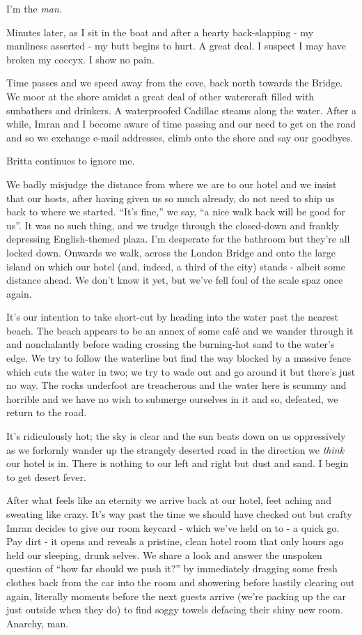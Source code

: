 \documentclass[a5paper,titlepage,draft]{book}
\begin{document}
I'm the \emph{man}.

Minutes later, as I sit in the boat and after a hearty back-slapping - my manliness asserted - my butt begins to hurt.  A great deal.  I suspect I may have broken my coccyx.  I show no pain.

Time passes and we speed away from the cove, back north towards the Bridge.  We moor at the shore amidst a great deal of other watercraft filled with sunbathers and drinkers.  A waterproofed Cadillac steams along the water.  After a while, Imran and I become aware of time passing and our need to get on the road and so we exchange e-mail addresses, climb onto the shore and say our goodbyes.

Britta continues to ignore me.

We badly misjudge the distance from where we are to our hotel and we insist that our hosts, after having given us so much already, do not need to ship us back to where we started.  ``It's fine,'' we say, ``a nice walk back will be good for us''.  It was no such thing, and we trudge through the closed-down and frankly depressing English-themed plaza.  I'm desperate for the bathroom but they're all locked down.  Onwards we walk, across the London Bridge and onto the large island on which our hotel (and, indeed, a third of the city) stands - albeit some distance ahead.  We don't know it yet, but we've fell foul of the scale spaz once again.

It's our intention to take short-cut by heading into the water past the nearest beach.  The beach appears to be an annex of some caf\'{e} and we wander through it and nonchalantly before wading crossing the burning-hot sand to the water's edge.  We try to follow the waterline but find the way blocked by a massive fence which cuts the water in two; we try to wade out and go around it but there's just no way.  The rocks underfoot are treacherous and the water here is scummy and horrible and we have no wish to submerge ourselves in it and so, defeated, we return to the road.

It's ridiculously hot; the sky is clear and the sun beats down on us oppressively as we forlornly wander up the strangely deserted road in the direction we \emph{think} our hotel is in.  There is nothing to our left and right but dust and sand.  I begin to get desert fever.

After what feels like an eternity we arrive back at our hotel, feet aching and sweating like crazy.  It's way past the time we should have checked out but crafty Imran decides to give our room keycard - which we've held on to - a quick go.  Pay dirt - it opens and reveals a pristine, clean hotel room that only hours ago held our sleeping, drunk selves.  We share a look and answer the unspoken question of ``how far should we push it?'' by immediately dragging some fresh clothes back from the car into the room and showering before hastily clearing out again, literally moments before the next guests arrive (we're packing up the car just outside when they do) to find soggy towels defacing their shiny new room.  Anarchy, man.
\end{document}
